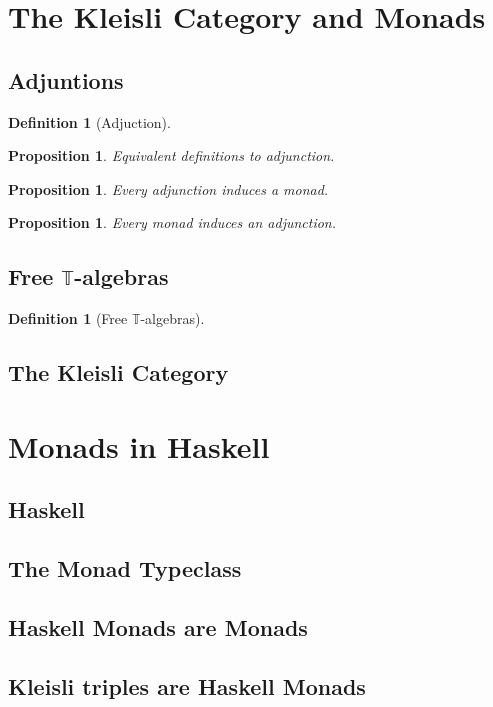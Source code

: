 \documentclass[a4paper]{article}
\theoremstyle{plain}
\newtheorem{proposition}[theorem]{Proposition}
\theoremstyle{definition}
\newtheorem{definition}[theorem]{Definition}
\newcommand{\cat}[1]{\mathcal{#1}}
\begin{document}

\section{The Kleisli Category and Monads}
\subsection{Adjuntions}
\begin{definition}[Adjuction]
\end{definition}
\begin{proposition}
    Equivalent definitions to adjunction.
\end{proposition}
\begin{proposition}
    Every adjunction induces a monad.
\end{proposition}
\begin{proposition}
    Every monad induces an adjunction.
\end{proposition}
\subsection{Free $\mathbb{T}$-algebras}
\begin{definition}[Free $\mathbb{T}$-algebras]
\end{definition}
\subsection{The Kleisli Category}

\section{Monads in Haskell}
\subsection{Haskell}
\subsection{The Monad Typeclass}
\subsection{Haskell Monads are Monads}
\subsection{Kleisli triples are Haskell Monads}
\end{document}
